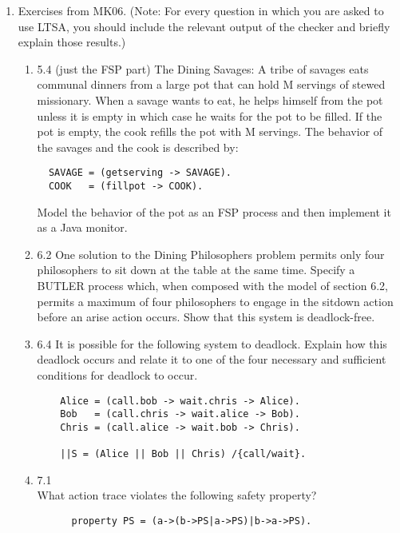 \documentclass{article}
\begin{document}

\begin{enumerate}
\item Exercises from MK06. ({\sc Note}: For every question in which you are asked to use LTSA, you should include the relevant output of the checker and briefly explain those results.)
\begin{enumerate}
\item 5.4 (just the FSP part)
  The Dining Savages: A tribe of savages eats communal dinners from a large pot that can hold M servings of stewed missionary. When a savage wants to eat, he helps himself from the pot unless it is empty in which case he waits for the pot to be filled. If the pot is empty, the cook refills the pot with M servings. The behavior of the savages and the cook is described by:
  \begin{verbatim}
  SAVAGE = (getserving -> SAVAGE).
  COOK   = (fillpot -> COOK).
  \end{verbatim}
  Model the behavior of the pot as an FSP process and then implement it as a Java monitor. \\
\item 6.2
  One solution to the Dining Philosophers problem permits only four philosophers to sit down at the table at the same time. Specify a BUTLER process which, when composed with the model of section 6.2, permits a maximum of four philosophers to engage in the sitdown action before an arise action occurs. Show that this system is deadlock-free.
\item 6.4
  It is possible for the following system to deadlock. Explain how this deadlock occurs and relate it to one of the four necessary and sufficient conditions for deadlock to occur.
    \begin{verbatim}
    Alice = (call.bob -> wait.chris -> Alice).
    Bob   = (call.chris -> wait.alice -> Bob).
    Chris = (call.alice -> wait.bob -> Chris).

    ||S = (Alice || Bob || Chris) /{call/wait}.
    \end{verbatim}
  \item 7.1 \\
    What action trace violates the following safety property?
    \begin{verbatim}
      property PS = (a->(b->PS|a->PS)|b->a->PS). 
    \end{verbatim}
    

\end{enumerate}
\end{enumerate}
\end{document}
